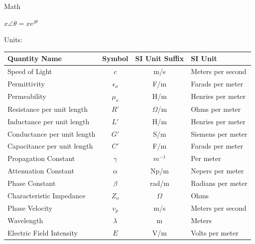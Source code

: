 \documentclass{book}
\begin{document}
Math

\begin{outline}
	\1 $x \angle \theta = x e^{j\theta}$
\end{outline}


Units:

\begin{table}
	\centering
	\begin{tabular}{lccl} \toprule
		\textbf{Quantity Name}      & \textbf{Symbol} & \textbf{SI Unit Suffix} & \textbf{SI Unit}  \\ \midrule
		Speed of Light              & $c$             & m/s                     & Meters per second \\ \midrule
		Permittivity                & $\epsilon_o$    & F/m                     & Farads per meter  \\ \midrule
		Permeability                & $\mu_o$         & H/m                     & Henries per meter \\ \midrule
		Resistance per unit length  & $R'$            & $\Omega$/m              & Ohms per meter    \\ \midrule
		Inductance per unit length  & $L'$            & H/m                     & Henries per meter \\ \midrule
		Conductance per unit length & $G'$            & S/m                     & Siemens per meter \\ \midrule
		Capacitance per unit length & $C'$            & F/m                     & Farads per meter  \\ \midrule
		Propagation Constant        & $\gamma$        & $m^{-1}$                & Per meter         \\ \midrule
		Attenuation Constant        & $\alpha$        & Np/m                    & Nepers per meter  \\ \midrule
		Phase Constant              & $\beta$         & rad/m                   & Radians per meter \\ \midrule
		Characteristic Impedance    & $Z_o$           & $\Omega$                & Ohms              \\ \midrule
		Phase Velocity              & $v_p$           & m/s                     & Meters per second \\ \midrule
		Wavelength                  & $\lambda$       & m                       & Meters            \\ \midrule
		Electric Field Intensity    & $E$             & V/m                     & Volts per meter   \\ \midrule

\end{tabular}
\end{table}
\end{document}
